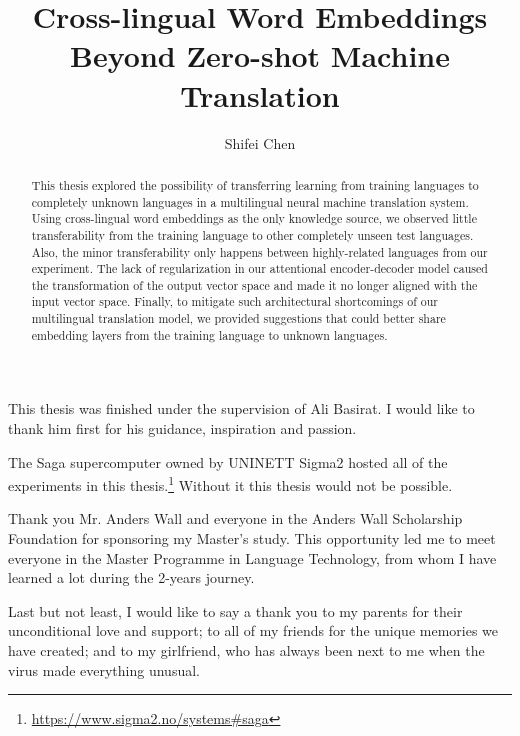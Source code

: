 \documentclass[thesis,fonts=libertine]{cluu}
\begin{document}
\author{Shifei Chen}
\title{Cross-lingual Word Embeddings Beyond Zero-shot Machine Translation}

\maketitle

\begin{abstract}
  This thesis explored the possibility of transferring learning from training languages to completely unknown languages in a multilingual neural machine translation system. Using cross-lingual word embeddings as the only knowledge source, we observed little transferability from the training language to other completely unseen test languages. Also, the minor transferability only happens between highly-related languages from our experiment. The lack of regularization in our attentional encoder-decoder model caused the transformation of the output vector space and made it no longer aligned with the input vector space. Finally, to mitigate such architectural shortcomings of our multilingual translation model, we provided suggestions that could better share embedding layers from the training language to unknown languages.
\end{abstract}

\tableofcontents


This thesis was finished under the supervision of Ali Basirat. I would like 
to thank him first for his guidance, inspiration and passion.

The Saga supercomputer owned by UNINETT Sigma2 hosted all of the experiments in this thesis.\footnote{\url{https://www.sigma2.no/systems\#saga}} Without it this thesis would not be possible.

Thank you Mr. Anders Wall and everyone in the Anders Wall Scholarship Foundation for sponsoring my Master's study. This opportunity led me to meet everyone in the Master Programme in Language Technology, from whom I have learned a lot during the 2-years journey.

Last but not least, I would like to say a thank you to my parents for their unconditional love and support; to all of my friends for the unique memories we have created; and to my girlfriend, who has always been next to me when the virus made everything unusual.

\end{document}
